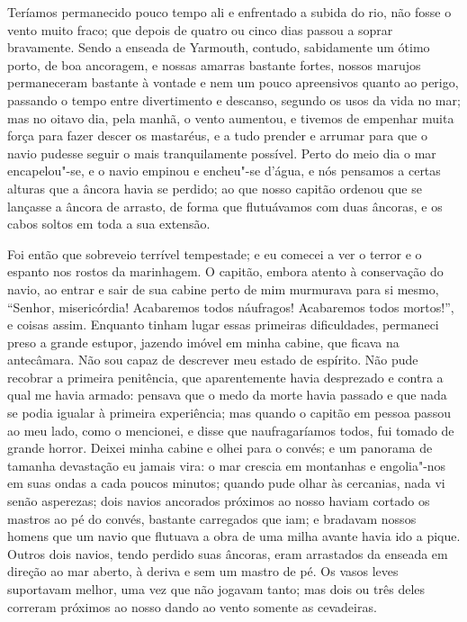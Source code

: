 Teríamos permanecido pouco tempo ali e enfrentado a subida do rio, não
fosse o vento muito fraco; que depois de quatro ou cinco dias passou a
soprar bravamente. Sendo a enseada de Yarmouth, contudo, sabidamente um
ótimo porto, de boa ancoragem, e nossas amarras bastante fortes, nossos
marujos permaneceram bastante à vontade e nem um pouco apreensivos
quanto ao perigo, passando o tempo entre divertimento e descanso,
segundo os usos da vida no mar; mas no oitavo dia, pela manhã, o vento
aumentou, e tivemos de empenhar muita força para fazer descer os
mastaréus, e a tudo prender e arrumar para que o navio pudesse seguir o
mais tranquilamente possível. Perto do meio dia o mar encapelou"-se, e o
navio empinou e encheu"-se d'água, e nós pensamos a certas alturas que a
âncora havia se perdido; ao que nosso capitão ordenou que se lançasse a
âncora de arrasto, de forma que flutuávamos com duas âncoras, e os cabos
soltos em toda a sua extensão.

Foi então que sobreveio terrível tempestade; e eu comecei a ver o terror
e o espanto nos rostos da marinhagem. O capitão, embora atento à
conservação do navio, ao entrar e sair de sua cabine perto de mim
murmurava para si mesmo, ``Senhor, misericórdia! Acabaremos todos
náufragos! Acabaremos todos mortos!'', e coisas assim. Enquanto tinham
lugar essas primeiras dificuldades, permaneci preso a grande estupor,
jazendo imóvel em minha cabine, que ficava na antecâmara. Não sou capaz
de descrever meu estado de espírito. Não pude recobrar a primeira
penitência, que aparentemente havia desprezado e contra a qual me havia
armado: pensava que o medo da morte havia passado e que nada se podia
igualar à primeira experiência; mas quando o capitão em pessoa passou ao
meu lado, como o mencionei, e disse que naufragaríamos todos, fui tomado
de grande horror. Deixei minha cabine e olhei para o convés; e um
panorama de tamanha devastação eu jamais vira: o mar crescia em
montanhas e engolia"-nos em suas ondas a cada poucos minutos; quando pude
olhar às cercanias, nada vi senão asperezas; dois navios ancorados
próximos ao nosso haviam cortado os mastros ao pé do convés, bastante
carregados que iam; e bradavam nossos homens que um navio que flutuava a
obra de uma milha avante havia ido a pique. Outros dois navios, tendo
perdido suas âncoras, eram arrastados da enseada em direção ao mar
aberto, à deriva e sem um mastro de pé. Os vasos leves suportavam
melhor, uma vez que não jogavam tanto; mas dois ou três deles correram
próximos ao nosso dando ao vento somente as cevadeiras.

